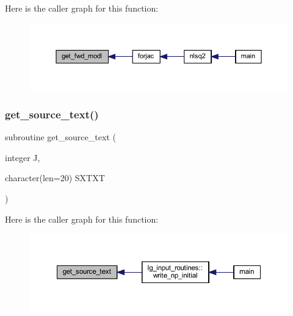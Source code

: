 Here is the caller graph for this function\+:\nopagebreak
\begin{figure}[H]
\begin{center}
\leavevmode
\includegraphics[width=350pt]{Leroi_8f90_a38a723748e0c805e5dfbd851b9c62b3e_icgraph}
\end{center}
\end{figure}
\mbox{\label{Leroi_8f90_afc048db626c18fa128abba7a8c2100f6}} 
\subsubsection{\texorpdfstring{get\+\_\+source\+\_\+text()}{get\_source\_text()}}
{\footnotesize\ttfamily subroutine get\+\_\+source\+\_\+text (\begin{DoxyParamCaption}\item[{integer}]{J,  }\item[{character(len=20)}]{S\+X\+T\+XT }\end{DoxyParamCaption})}

Here is the caller graph for this function\+:\nopagebreak
\begin{figure}[H]
\begin{center}
\leavevmode
\includegraphics[width=350pt]{Leroi_8f90_afc048db626c18fa128abba7a8c2100f6_icgraph}
\end{center}
\end{figure}
\mbox{\label{Leroi_8f90_a602ef79dc6e8eaec1a5e258d5a385ae9}} 
